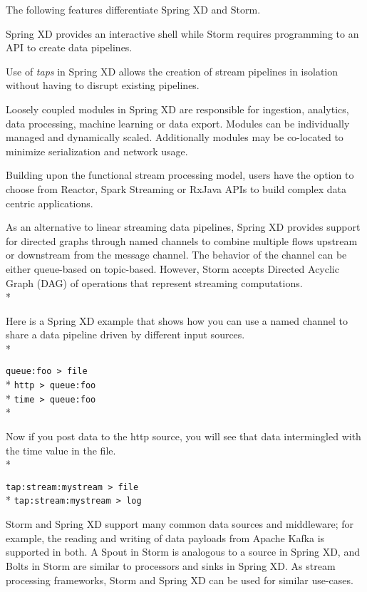 The following features differentiate Spring XD and Storm.

\begin{itemize*}
\item Spring XD provides an interactive shell while Storm requires programming
to an API to create data pipelines.
\item Use of \emph{taps} in Spring XD allows the creation of stream pipelines
in isolation without having to disrupt existing pipelines.
\item Loosely coupled modules in Spring XD are responsible for ingestion, analytics,
data processing, machine learning or data export. Modules can be individually managed
and dynamically scaled. Additionally modules may be co-located to minimize
serialization and network usage.
\item Building upon the functional stream processing model, users have the option
to choose from Reactor\cite{reactor}, Spark Streaming or RxJava APIs to build
complex data centric applications.
\item As an alternative to linear streaming data pipelines, Spring XD provides
support for directed graphs through named channels to combine multiple flows
upstream or downstream from the message channel. The behavior of the channel
can be either queue-based on topic-based. However, Storm accepts Directed
Acyclic Graph (DAG)\cite{dag} of operations that represent streaming
computations.\\*

Here is a Spring XD example that shows how you can use a named channel to share
a data pipeline driven by different input sources.\\*

\verb;queue:foo > file;\\*
\verb;http > queue:foo;\\*
\verb;time > queue:foo;\\*

Now if you post data to the http source, you will see that data intermingled
with the time value in the file.\\*

\verb;tap:stream:mystream > file;\\*
\verb;tap:stream:mystream > log;

\end{itemize*}

Storm and Spring XD support many common data sources and middleware;
for example, the reading and writing of data payloads from Apache Kafka
is supported in both. A Spout in Storm is analogous to a
source in Spring XD, and Bolts in Storm are similar to processors and sinks
in Spring XD. As stream processing frameworks, Storm and Spring XD can be used for
similar use-cases.

